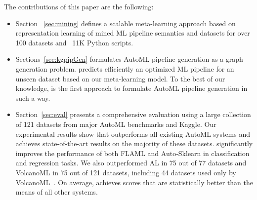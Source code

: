 The contributions of this paper are the following:
\begin{itemize}
    \item Section ~\ref{sec:mining} defines a scalable meta-learning approach based on representation learning of mined ML pipeline semantics and datasets for over 100 datasets and ~11K Python scripts.  
    \newline
    \item Sections~\ref{sec:kgpipGen} formulates AutoML pipeline generation as a graph generation problem. {\sysname} predicts efficiently an optimized ML pipeline for an unseen dataset based on our meta-learning model.  To the best of our knowledge, {\sysname} is the first approach to formulate  AutoML pipeline generation in such a way.
    \newline
    \item Section~\ref{sec:eval} presents a comprehensive evaluation using a large collection of 121 datasets from major AutoML benchmarks and Kaggle. Our experimental results show that {\sysname} outperforms all existing AutoML systems and achieves state-of-the-art results on the majority of these datasets. {\sysname} significantly improves the performance of both FLAML and Auto-Sklearn in classification and regression tasks. We also outperformed AL in 75 out of 77 datasets and VolcanoML in 75  out of 121 datasets, including 44 datasets used only by VolcanoML~\cite{VolcanoML}.  On average, {\sysname} achieves scores that are statistically better than the means of all other systems. 
\end{itemize}


